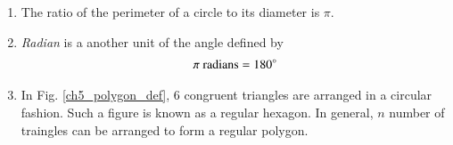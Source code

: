 \begin{enumerate}[label=\arabic*.,ref=\thesubsection.\theenumi]
\item The ratio of the perimeter of a circle to its diameter is $\pi$.
\label{prob:circ_peri_dia}
\item {\em Radian} is a another unit of the angle defined by
%
\begin{align}
\pi \text{ radians} = 180 \degree
\end{align}
%
\item
	In Fig. \ref{ch5_polygon_def}, 6 congruent triangles are arranged in a circular fashion.  Such a figure is known as a regular hexagon.  In general, $n$ number of traingles can be arranged to form a regular polygon.
\begin{figure}[!ht]
	\begin{center}
		

\end{center}
\end{figure}
\end{enumerate}

